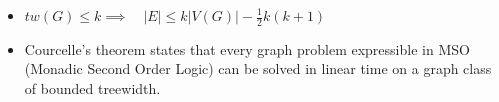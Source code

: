 \begin{remark}\label{8.12}
    \begin{itemize}
        \item $tw(G)\leq k\implies \quad |E|\leq k|V(G)|-\frac{1}{2}k(k+1)$
        \item Courcelle's theorem states that every graph problem expressible in MSO (Monadic Second Order Logic) can be solved in linear time on a graph class of bounded treewidth.   
    \end{itemize}
\end{remark}
